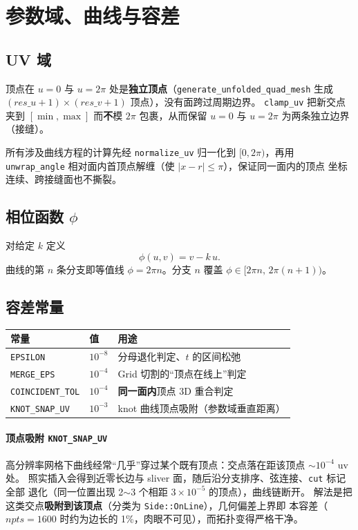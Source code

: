 \documentclass{article}
\begin{document}
\section{参数域、曲线与容差}

\subsection*{UV 域}

顶点在 $u=0$ 与 $u=2\pi$ 处是\textbf{独立顶点}（\texttt{generate\_unfolded\_quad\_mesh}
生成 $(res\_u+1)\times(res\_v+1)$ 顶点），没有面跨过周期边界。
\texttt{clamp\_uv} 把新交点夹到 $[\min,\max]$ 而\textbf{不}模 $2\pi$ 包裹，从而保留
$u=0$ 与 $u=2\pi$ 为两条独立边界（接缝）。

所有涉及曲线方程的计算先经 \texttt{normalize\_uv} 归一化到 $[0,2\pi)$，再用
\texttt{unwrap\_angle} 相对面内首顶点解缠（使 $|x-r|\le\pi$），保证同一面内的顶点
坐标连续、跨接缝面也不撕裂。

\subsection*{相位函数 $\phi$}

对给定 $k$ 定义
\[
\phi(u,v) = v - k\,u .
\]
曲线的第 $n$ 条分支即等值线 $\phi = 2\pi n$。分支 $n$ 覆盖 $\phi\in[2\pi n,\,2\pi(n+1))$。

\subsection*{容差常量}

\begin{center}
\begin{tabular}{@{}llp{7.6cm}@{}}
\hline
\textbf{常量} & \textbf{值} & \textbf{用途} \\
\hline
\texttt{EPSILON} & $10^{-8}$ & 分母退化判定、$t$ 的区间松弛 \\
\texttt{MERGE\_EPS} & $10^{-4}$ & Grid 切割的“顶点在线上”判定 \\
\texttt{COINCIDENT\_TOL} & $10^{-4}$ & \textbf{同一面内}顶点 3D 重合判定 \\
\texttt{KNOT\_SNAP\_UV} & $10^{-3}$ & knot 曲线顶点吸附（参数域垂直距离） \\
\hline
\end{tabular}
\end{center}

\paragraph{顶点吸附 \texttt{KNOT\_SNAP\_UV}}
高分辨率网格下曲线经常“几乎”穿过某个既有顶点：交点落在距该顶点 $\sim10^{-4}$ uv 处。
照实插入会得到近零长边与 sliver 面，随后沿分支排序、弦连接、\texttt{cut} 标记全部
退化（同一位置出现 2$\sim$3 个相距 $3\times10^{-5}$ 的顶点），曲线链断开。
解法是把这类交点\textbf{吸附到该顶点}（分类为 \texttt{Side::OnLine}），几何偏差上界即
本容差（$npts=1600$ 时约为边长的 1\%，肉眼不可见），而拓扑变得严格干净。
\end{document}
